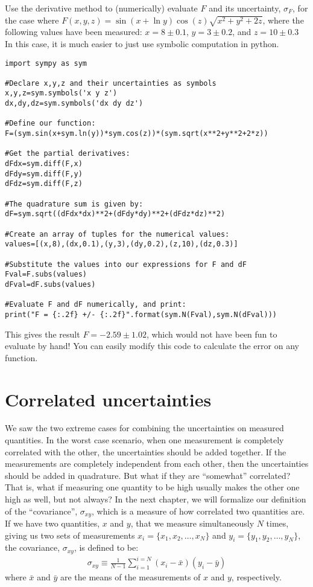 \begin{example}{}{Use the derivative method to (numerically) evaluate $F$ and its uncertainty, $\sigma_{F}$, for the case where $F(x,y,z)=\sin(x+\ln y)\cos(z)\sqrt{x^2+y^2+2z}$, where the following values have been measured: $x=8\pm0.1$, $y=3\pm0.2$, and $z=10\pm0.3$ }{}
In this case, it is much easier to just use symbolic computation in python.
\begin{lstlisting}[frame=single] 
import sympy as sym

#Declare x,y,z and their uncertainties as symbols
x,y,z=sym.symbols('x y z') 
dx,dy,dz=sym.symbols('dx dy dz')

#Define our function:
F=(sym.sin(x+sym.ln(y))*sym.cos(z))*(sym.sqrt(x**2+y**2+2*z))

#Get the partial derivatives:
dFdx=sym.diff(F,x)
dFdy=sym.diff(F,y)
dFdz=sym.diff(F,z)

#The quadrature sum is given by:
dF=sym.sqrt((dFdx*dx)**2+(dFdy*dy)**2+(dFdz*dz)**2)

#Create an array of tuples for the numerical values:
values=[(x,8),(dx,0.1),(y,3),(dy,0.2),(z,10),(dz,0.3)]

#Substitute the values into our expressions for F and dF
Fval=F.subs(values)
dFval=dF.subs(values)

#Evaluate F and dF numerically, and print:
print("F = {:.2f} +/- {:.2f}".format(sym.N(Fval),sym.N(dFval)))
\end{lstlisting}
This gives the result $F = -2.59 \pm 1.02$, which would not have been fun to evaluate by hand! You can easily modify this code to calculate the error on any function. 
\end{example}

\section{Correlated uncertainties}
We saw the two extreme cases for combining the uncertainties on measured quantities. In the worst case scenario, when one measurement is completely correlated with the other, the uncertainties should be added together. If the measurements are completely independent from each other, then the uncertainties should be added in quadrature. But what if they are ``somewhat'' correlated? That is, what if measuring one quantity to be high usually makes the other one high as well, but not always? In the next chapter, we will formalize our definition of the ``covariance'', $\sigma_{xy}$, which is a measure of how correlated two quantities are. If we have two quantities, $x$ and $y$, that we measure simultaneously $N$ times, giving us two sets of measurements  $x_i=\{x_1, x_2,\dots, x_N\}$ and $y_i=\{y_1, y_2,\dots, y_N\}$, the covariance, $\sigma_{xy}$, is defined to be:
\begin{align}
\sigma_{xy}\equiv\frac{1}{N-1}\sum_{i=1}^{i=N}(x_i-\bar x)(y_i-\bar y)
\end{align}
where $\bar x$ and $\bar y$ are the means of the measurements of $x$ and $y$, respectively.


